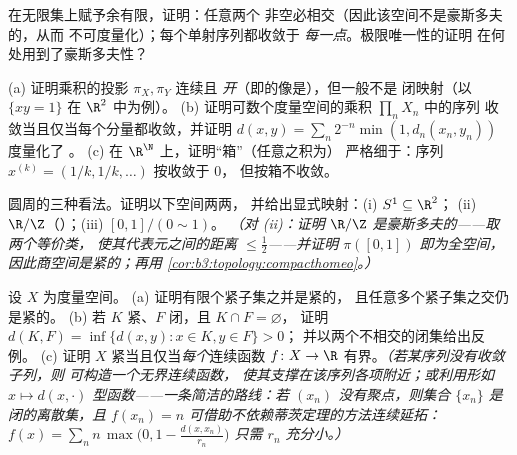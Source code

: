 \begin{exercise}[$\star$]\label{exo:b3:topology:3}
在无限集上赋予余有限，证明：任意两个
非空必相交（因此该空间不是豪斯多夫的，从而
不可度量化）；每个单射序列都收敛于
\emph{每一点}。极限唯一性的证明
在何处用到了豪斯多夫性？
\end{exercise}

\begin{exercise}[$\star\star$]\label{exo:b3:topology:4}
(a) 证明乘积的投影 $\pi_X, \pi_Y$ 连续且
\emph{开}（即的像是），但一般不是
闭映射（以 $\{xy = 1\}$ 在 $\R^2$ 中为例）。
(b) 证明可数个度量空间的乘积 $\prod_n X_n$ 中的序列
收敛当且仅当每个分量都收敛，并证明
$d(x, y) = \sum_n 2^{-n}\min(1, d_n(x_n, y_n))$ 度量化了
。
(c) 在 $\R^\N$ 上，证明“箱”（任意之积为）
严格细于：序列
$x^{(k)} = (1/k, 1/k, \dots)$ 按收敛于 $0$，
但按箱不收敛。
\end{exercise}

\begin{exercise}[$\star\star$]\label{exo:b3:topology:5}
圆周的三种看法。证明以下空间两两，
并给出显式映射：(i) $S^1 \subseteq \R^2$；
(ii) $\R/\Z$（）；(iii) $[0,1]/(0 \sim 1)$。
\emph{（对 (ii)：证明 $\R/\Z$ 是豪斯多夫的——取两个等价类，
使其代表元之间的距离 $\leq \frac12$——并证明
$\pi([0,1])$ 即为全空间，因此商空间是紧的；再用
\cref{cor:b3:topology:compacthomeo}。）}
\end{exercise}

\begin{exercise}[$\star\star$]\label{exo:b3:topology:6}
设 $X$ 为度量空间。
(a) 证明有限个紧子集之并是紧的，
且任意多个紧子集之交仍是紧的。
(b) 若 $K$ 紧、$F$ 闭，且 $K \cap F = \varnothing$，
证明 $d(K, F) = \inf\{d(x,y) : x \in K, y \in F\} > 0$；
并以两个不相交的闭集给出反例。
(c) 证明 $X$ 紧当且仅当\emph{每个}连续函数 $f
\colon X \to \R$ 有界。\emph{（若某序列没有收敛子列，则
可构造一个无界连续函数，
使其支撑在该序列各项附近；或利用形如 $x \mapsto
d(x, \cdot)$ 型函数——一条简洁的路线：若 $(x_n)$
没有聚点，则集合 $\{x_n\}$ 是闭的离散集，且
$f(x_n) = n$ 可借助不依赖蒂茨定理的方法连续延拓：
$f(x) = \sum_n n\,\max\bigl(0, 1 - \frac{d(x, x_n)}{r_n}\bigr)$
只需 $r_n$ 充分小。）}
\end{exercise}

